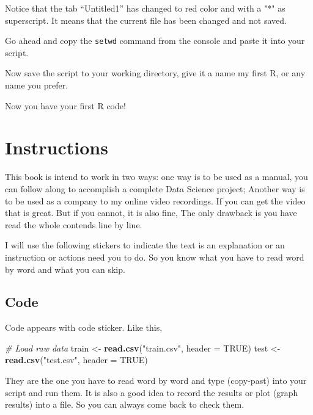 \documentclass[
]{book}
\newenvironment{Shaded}{\begin{snugshade}}{\end{snugshade}}
\newcommand{\CommentTok}[1]{\textcolor[rgb]{0.56,0.35,0.01}{\textit{#1}}}
\newcommand{\DataTypeTok}[1]{\textcolor[rgb]{0.13,0.29,0.53}{#1}}
\newcommand{\KeywordTok}[1]{\textcolor[rgb]{0.13,0.29,0.53}{\textbf{#1}}}
\newcommand{\NormalTok}[1]{#1}
\newcommand{\OtherTok}[1]{\textcolor[rgb]{0.56,0.35,0.01}{#1}}
\newcommand{\StringTok}[1]{\textcolor[rgb]{0.31,0.60,0.02}{#1}}
\begin{document}
Notice that the tab ``Untitled1'' has changed to red color and with a "*" as superscript. It means that the current file has been changed and not saved.

Go ahead and copy the \texttt{setwd} command from the console and paste it into your script.

Now save the script to your working directory, give it a name my first R, or any name you prefer.

Now you have your first R code!

\hypertarget{instructions}{%
\section{Instructions}\label{instructions}}

This book is intend to work in two ways: one way is to be used as a manual, you can follow along to accomplish a complete Data Science project; Another way is to be used as a company to my online video recordings. If you can get the video that is great. But if you cannot, it is also fine, The only drawback is you have read the whole contends line by line.

I will use the following stickers to indicate the text is an explanation or an instruction or actions need you to do. So you know what you have to read word by word and what you can skip.

\hypertarget{code}{%
\subsection*{Code}\label{code}}


Code appears with code sticker. Like this,

\begin{Shaded}
\begin{Highlighting}[]
\CommentTok{# Load raw data}
\NormalTok{train <-}\StringTok{ }\KeywordTok{read.csv}\NormalTok{(}\StringTok{"train.csv"}\NormalTok{, }\DataTypeTok{header =} \OtherTok{TRUE}\NormalTok{)}
\NormalTok{test <-}\StringTok{ }\KeywordTok{read.csv}\NormalTok{(}\StringTok{"test.csv"}\NormalTok{, }\DataTypeTok{header =} \OtherTok{TRUE}\NormalTok{)}
\end{Highlighting}
\end{Shaded}

They are the one you have to read word by word and type (copy-past) into your script and run them. It is also a good idea to record the results or plot (graph results) into a file. So you can always come back to check them.
\end{document}
